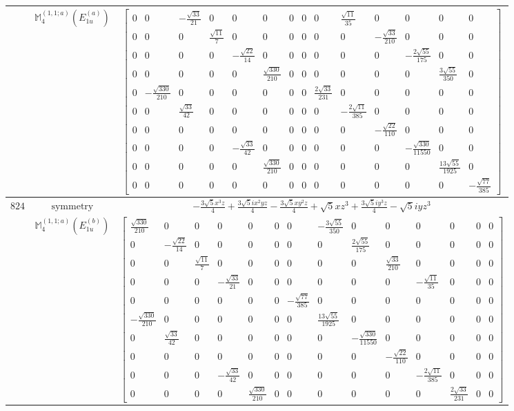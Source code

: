 \documentclass[fleqn,8pt,landscape]{jsarticle}
\begin{document}
\begin{longtable}{ccc}
$  $ & $ \mathbb{M}_{4}^{(1,1;a)}(E_{1u}^{(a)}) $ & $ \begin{bmatrix} 0 & 0 & - \frac{\sqrt{33}}{21} & 0 & 0 & 0 & 0 & 0 & 0 & \frac{\sqrt{11}}{35} & 0 & 0 & 0 & 0 \\ 0 & 0 & 0 & \frac{\sqrt{11}}{7} & 0 & 0 & 0 & 0 & 0 & 0 & - \frac{\sqrt{33}}{210} & 0 & 0 & 0 \\ 0 & 0 & 0 & 0 & - \frac{\sqrt{22}}{14} & 0 & 0 & 0 & 0 & 0 & 0 & - \frac{2 \sqrt{55}}{175} & 0 & 0 \\ 0 & 0 & 0 & 0 & 0 & \frac{\sqrt{330}}{210} & 0 & 0 & 0 & 0 & 0 & 0 & \frac{3 \sqrt{55}}{350} & 0 \\ 0 & - \frac{\sqrt{330}}{210} & 0 & 0 & 0 & 0 & 0 & 0 & \frac{2 \sqrt{33}}{231} & 0 & 0 & 0 & 0 & 0 \\ 0 & 0 & \frac{\sqrt{33}}{42} & 0 & 0 & 0 & 0 & 0 & 0 & - \frac{2 \sqrt{11}}{385} & 0 & 0 & 0 & 0 \\ 0 & 0 & 0 & 0 & 0 & 0 & 0 & 0 & 0 & 0 & - \frac{\sqrt{22}}{110} & 0 & 0 & 0 \\ 0 & 0 & 0 & 0 & - \frac{\sqrt{33}}{42} & 0 & 0 & 0 & 0 & 0 & 0 & - \frac{\sqrt{330}}{11550} & 0 & 0 \\ 0 & 0 & 0 & 0 & 0 & \frac{\sqrt{330}}{210} & 0 & 0 & 0 & 0 & 0 & 0 & \frac{13 \sqrt{55}}{1925} & 0 \\ 0 & 0 & 0 & 0 & 0 & 0 & 0 & 0 & 0 & 0 & 0 & 0 & 0 & - \frac{\sqrt{77}}{385} \end{bmatrix} $ \\ \hline
$ 824 $ & $ \text{symmetry} $ & $ - \frac{3 \sqrt{5} x^{3} z}{4} + \frac{3 \sqrt{5} i x^{2} y z}{4} - \frac{3 \sqrt{5} x y^{2} z}{4} + \sqrt{5} x z^{3} + \frac{3 \sqrt{5} i y^{3} z}{4} - \sqrt{5} i y z^{3} $ \\
$  $ & $ \mathbb{M}_{4}^{(1,1;a)}(E_{1u}^{(b)}) $ & $ \begin{bmatrix} \frac{\sqrt{330}}{210} & 0 & 0 & 0 & 0 & 0 & 0 & - \frac{3 \sqrt{55}}{350} & 0 & 0 & 0 & 0 & 0 & 0 \\ 0 & - \frac{\sqrt{22}}{14} & 0 & 0 & 0 & 0 & 0 & 0 & \frac{2 \sqrt{55}}{175} & 0 & 0 & 0 & 0 & 0 \\ 0 & 0 & \frac{\sqrt{11}}{7} & 0 & 0 & 0 & 0 & 0 & 0 & \frac{\sqrt{33}}{210} & 0 & 0 & 0 & 0 \\ 0 & 0 & 0 & - \frac{\sqrt{33}}{21} & 0 & 0 & 0 & 0 & 0 & 0 & - \frac{\sqrt{11}}{35} & 0 & 0 & 0 \\ 0 & 0 & 0 & 0 & 0 & 0 & - \frac{\sqrt{77}}{385} & 0 & 0 & 0 & 0 & 0 & 0 & 0 \\ - \frac{\sqrt{330}}{210} & 0 & 0 & 0 & 0 & 0 & 0 & \frac{13 \sqrt{55}}{1925} & 0 & 0 & 0 & 0 & 0 & 0 \\ 0 & \frac{\sqrt{33}}{42} & 0 & 0 & 0 & 0 & 0 & 0 & - \frac{\sqrt{330}}{11550} & 0 & 0 & 0 & 0 & 0 \\ 0 & 0 & 0 & 0 & 0 & 0 & 0 & 0 & 0 & - \frac{\sqrt{22}}{110} & 0 & 0 & 0 & 0 \\ 0 & 0 & 0 & - \frac{\sqrt{33}}{42} & 0 & 0 & 0 & 0 & 0 & 0 & - \frac{2 \sqrt{11}}{385} & 0 & 0 & 0 \\ 0 & 0 & 0 & 0 & \frac{\sqrt{330}}{210} & 0 & 0 & 0 & 0 & 0 & 0 & \frac{2 \sqrt{33}}{231} & 0 & 0 \end{bmatrix} $ \\ \hline

\end{longtable}
\end{document}
